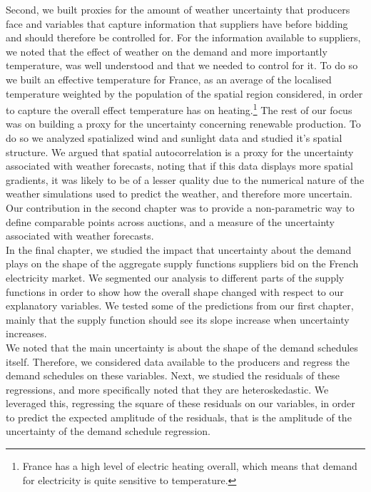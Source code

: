 Second, we built proxies for the amount of weather uncertainty that producers face and variables that capture information that suppliers have before bidding and should therefore be controlled for. For the information available to suppliers, we noted that the effect of weather on the demand and more importantly temperature, was well understood and that we needed to control for it. To do so we built an effective temperature for France, as an average of the localised temperature weighted by the population of the spatial region considered, in order to capture the overall effect temperature has on heating.\footnote{France has a high level of electric heating overall, which means that demand for electricity is quite sensitive to temperature.} The rest of our focus was on building a proxy for the uncertainty concerning renewable production. To do so we analyzed spatialized wind and sunlight data and studied it's spatial structure. We argued that spatial autocorrelation is a proxy for the uncertainty associated with weather forecasts, noting that if this data displays more spatial gradients, it was likely to be of a lesser quality due to the numerical nature of the weather simulations used to predict the weather, and therefore more uncertain.\\

Our contribution in the second chapter was to provide a non-parametric way to define comparable points across auctions, and a measure of the uncertainty associated with weather forecasts.\\

In the final chapter, we studied the impact that uncertainty about the demand plays on the shape of the aggregate supply functions suppliers bid on the French electricity market. We segmented our analysis to different parts of the supply functions in order to show how the overall shape changed with respect to our explanatory variables. We tested some of the predictions from our first chapter, mainly that the supply function should see its slope increase when uncertainty increases. \\

We noted that the main uncertainty is about the shape of the demand schedules itself. Therefore, we considered data available to the producers and regress the demand schedules on these variables. Next, we studied the residuals of these regressions, and more specifically noted that they are heteroskedastic. We leveraged this, regressing the square of these residuals on our variables, in order to predict the expected amplitude of the residuals, that is the amplitude of the uncertainty of the demand schedule regression.\\

